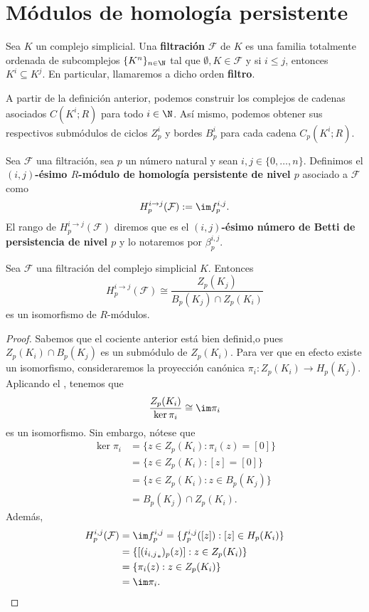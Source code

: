 \section{Módulos de homología persistente}
\begin{definicion}
	Sea $K$ un complejo simplicial. Una \textbf{filtración} $\mathcal{F}$ de $K$ es una familia totalmente ordenada de subcomplejos $\{K^n\}_{n \in \N}$ tal que $\emptyset, K \in \mathcal{F}$ y si $i \leq j$, entonces $K^i \subseteq K^j$. En particular, llamaremos a dicho orden \textbf{filtro}.
\end{definicion}
A partir de la definición anterior, podemos construir los complejos de cadenas asociados $C(K^i;R)$ para todo $i \in \N$. Así mismo, podemos obtener sus respectivos submódulos de ciclos $Z^i_p$ y bordes $B^i_p$ para cada cadena $C_p(K^i;R)$.
\begin{definicion}
	Sea $\mathcal{F}$ una filtración, sea $p$ un número natural y sean $i,j \in \{0, \dots, n\}$. Definimos el  \textbf{$(i,j)$-ésimo $R$-módulo de homología persistente de nivel $p$} asociado a $\mathcal{F}$ como
	\[
		H_p^{i \to j}(\mathcal{F}) := \im f_p^{i,j}.
	\]
	El rango de $H_p^{i \to j}(\mathcal{F})$ diremos que es el \textbf{$(i,j)$-ésimo número de Betti de persistencia de nivel $p$} y lo notaremos por $\beta_p^{i,j}$.
\end{definicion}
\begin{proposicion}
	Sea $\mathcal{F}$ una filtración del complejo simplicial $K$. Entonces
	\[
		H_p^{i \to j}(\mathcal{F}) \cong \frac{Z_p(K_j)}{B_p(K_j) \cap Z_p(K_i)}
	\]
	es un isomorfismo de $R$-módulos.
\end{proposicion}
\begin{proof}
	Sabemos que el cociente anterior está bien definid,o pues $Z_p(K_i) \cap B_p(K_j)$ es un submódulo de $Z_p(K_i)$. Para ver que en efecto existe un isomorfismo, consideraremos la proyección canónica $\pi_i : Z_p(K_i) \to H_p(K_j)$. Aplicando el , tenemos que 
	\[
		\frac{Z_p(K_i)}{\ker \pi_i} \cong \im \pi_i
	\]
	es un isomorfismo. Sin embargo, nótese que
	\begin{align*}
		\ker \pi_i &= \{z \in Z_p(K_i) : \pi_i(z) = [0] \} \\
				   &= \{z \in Z_p(K_i) : [z] = [0] \} \\ 
				   &= \{z \in Z_p(K_i) : z \in B_p(K_j) \} \\ 
				   &= B_p(K_j) \cap Z_p(K_i).
	\end{align*}
	Además, 
	\begin{align*}
		H_p^{i,j}(\mathcal{F}) &= \im f_p^{i,j} = \{f_p^{i,j}([z]) : [z] \in H_p(K_i) \} \\ 
							   &= \{[({i_{i,j}}_*)_p(z)] : z \in Z_p(K_i) \} \\ 
							   &= \{\pi_i(z) : z \in Z_p(K_i) \} \\
							   &= \im \pi_i.
	\end{align*}
\end{proof}
